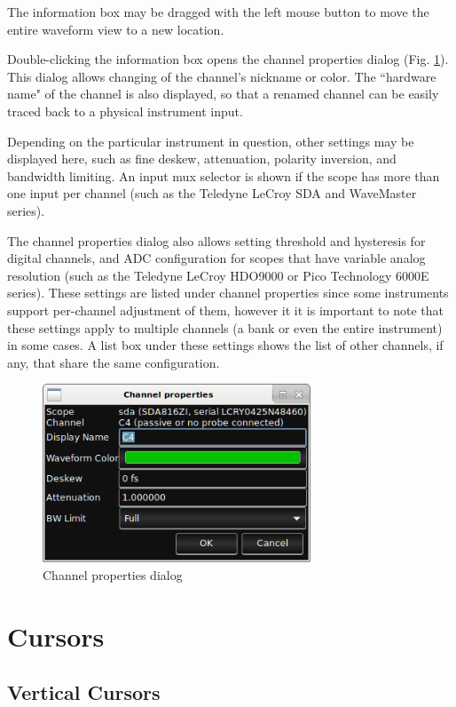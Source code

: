 The information box may be dragged with the left mouse button to move the entire waveform view to a new location.

Double-clicking the information box opens the channel properties dialog (Fig. \ref{channel-properties}). This dialog
allows changing of the channel's nickname or color. The ``hardware name" of the channel is also displayed, so that a
renamed channel can be easily traced back to a physical instrument input.

Depending on the particular instrument in question, other settings may be displayed here, such as fine deskew,
attenuation, polarity inversion, and bandwidth limiting. An input mux selector is shown if the scope has more than one
input per channel (such as the Teledyne LeCroy SDA and WaveMaster series).

The channel properties dialog also allows setting threshold and hysteresis for digital channels, and ADC configuration
for scopes that have variable analog resolution (such as the Teledyne LeCroy HDO9000 or Pico Technology 6000E series).
These settings are listed under channel properties since some instruments support per-channel adjustment of them,
however it it is important to note that these settings apply to multiple channels (a bank or even the entire
instrument) in some cases. A list box under these settings shows the list of other channels, if any, that share the
same configuration.

\begin{figure}[H]
\centering
\includegraphics[width=8cm]{images/channel-properties.png}
\caption{Channel properties dialog}
\label{channel-properties}
\end{figure}

\section{Cursors}
\label{sec:cursors}

\subsection{Vertical Cursors}

